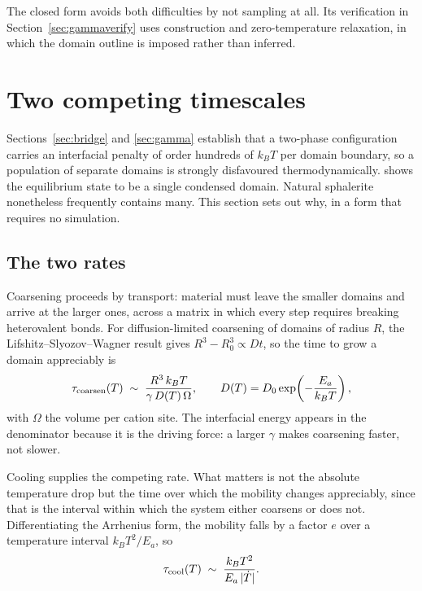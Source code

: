 \documentclass[preprint,12pt,authoryear]{elsarticle}
\begin{document}
The closed form avoids both difficulties by not sampling at all. Its verification
in Section~\ref{sec:gammaverify} uses construction and zero-temperature
relaxation, in which the domain outline is imposed rather than inferred.

\section{Two competing timescales}
\label{sec:timescales}

Sections~\ref{sec:bridge} and \ref{sec:gamma} establish that a two-phase
configuration carries an interfacial penalty of order hundreds of $k_BT$ per
domain boundary, so a population of separate domains is strongly disfavoured
thermodynamically. \citet{yu2026b} shows the equilibrium state to be a single
condensed domain. Natural sphalerite nonetheless frequently contains many. This
section sets out why, in a form that requires no simulation.

\subsection{The two rates}

Coarsening proceeds by transport: material must leave the smaller domains and
arrive at the larger ones, across a matrix in which every step requires breaking
heterovalent bonds. For diffusion-limited coarsening of domains of radius $R$,
the Lifshitz--Slyozov--Wagner result \citep{lifshitz1961} gives
$R^3 - R_0^3 \propto D t$, so the
time to grow a domain appreciably is
\begin{equation}
\tau_{\rm coarsen}(T) \;\sim\; \frac{R^3\, k_B T}{\gamma\, D(T)\, \Omega},
\qquad
D(T) = D_0 \exp\!\left(-\frac{E_a}{k_B T}\right),
\label{eq:taucoarsen}
\end{equation}
with $\Omega$ the volume per cation site. The interfacial energy appears in the
denominator because it is the driving force: a larger $\gamma$ makes coarsening
faster, not slower.

Cooling supplies the competing rate. What matters is not the absolute
temperature drop but the time over which the mobility changes appreciably, since
that is the interval within which the system either coarsens or does not.
Differentiating the Arrhenius form, the mobility falls by a factor $e$ over a
temperature interval $k_BT^2/E_a$, so
\begin{equation}
\tau_{\rm cool}(T) \;\sim\; \frac{k_B T^2}{E_a\, \lvert \dot{T} \rvert}.
\label{eq:taucool}
\end{equation}
\end{document}

